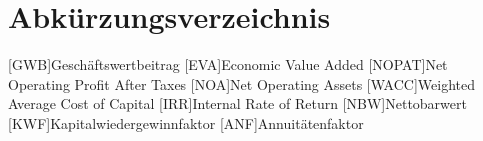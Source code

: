 \chapter{Abkürzungsverzeichnis}

\begin{acronym}
    [GWB]{Geschäftswertbeitrag}
    [EVA]{Economic Value Added}
    [NOPAT]{Net Operating Profit After Taxes}
    [NOA]{Net Operating Assets}
    [WACC]{Weighted Average Cost of Capital}
    [IRR]{Internal Rate of Return}
    [NBW]{Nettobarwert}
    [KWF]{Kapitalwiedergewinnfaktor}
    [ANF]{Annuitätenfaktor}
\end{acronym}